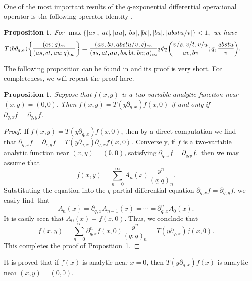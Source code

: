 \documentclass[10pt,a4paper]{amsart}
\numberwithin{equation}{section}
\newtheorem{Proposition}[Theorem]{Proposition}
 { \theoremstyle{definition}
\newtheorem{Definition}[Theorem]{Definition}
\newtheorem{Note}[Theorem]{Note}
\newtheorem{Example}[Theorem]{Example}
\newtheorem{Remark}[Theorem]{Remark} }
\begin{document}
One of the most important results of the $q$-exponential differential operational operator is the following operator identity \cite[equation~(3.1)]{Liu2010}.
\begin{Proposition}\label{liuopeppb}For $\max\{|as|, |at|, |au|, |bs|, |bt|, |bu|, |abstu/v|\}<1, $	we have
	\begin{align*}
		&T(b \partial_{q, a})\biggl\{\frac{(av; q)_\infty}{(as, at, au; q)_\infty}\biggr\}
=\frac{(av, bv, abstu/v; q)_\infty}{(as, at, au, bs, bt, bu; q)_\infty}
 {_3\phi_2}\biggl({{v/s, v/t, v/u}\atop{av, bv}}; q, \frac{abstu}{v}\biggr).
	\end{align*}
\end{Proposition}
The following proposition can be found in \cite[Lemma~13.2]{LiuRam2013} and its proof is very short. For completeness, we will repeat the proof here.
\begin{Proposition}\label{liulemope} Suppose that $f(x, y)$ is a two-variable analytic function near $(x, y)=(0, 0).$
	Then
	$f(x, y)=T(y \partial_{q, x})f(x, 0)$ if and only if $\partial_{q, x}f=\partial_{q, y}f$.
\end{Proposition}

\begin{proof}
	If $f(x, y)=T(y \partial_{q, x})f(x, 0)$, then by a direct computation we find that
	$\partial_{q, x}f=\partial_{q, y}f=T(y \partial_{q, x})\partial_{q, x}f(x, 0).$
	Conversely, if $f$ is a two-variable analytic function near $(x, y)=(0, 0)$, satisfying
	$\partial_{q, x}f=\partial_{q, y}f,$ then we may assume that
	\[
	f(x, y)=\sum_{n=0}^\infty A_n(x) \frac{y^n}{(q; q)_n}.
	\]
	Substituting the equation into the $q$-partial differential equation
	$\partial_{q, x}f=\partial_{q, y}f$, we easily find~that
	\[
	A_n(x)=\partial_{q, x}A_{n-1}(x)=\cdots=\partial^n_{q, x}A_0(x).
	\]
	It is easily seen that $A_0(x)=f(x, 0).$ Thus, we conclude that
	\[
	f(x, y)=\sum_{n=0}^\infty \partial^n_{q, x}f(x, 0)
	\frac{y^n}{(q; q)_n}
	=T(y \partial_{q, x})f(x, 0).
	\]
	This completes the proof of Proposition~\ref{liulemope}.
\end{proof}

It is proved \cite[Proposition~13.4]{LiuRam2013} that if $f(x)$ is analytic near $x=0$, then $T(y \partial_{q, x})f(x)$ is analytic near $(x, y)=(0, 0)$.
\end{document}
